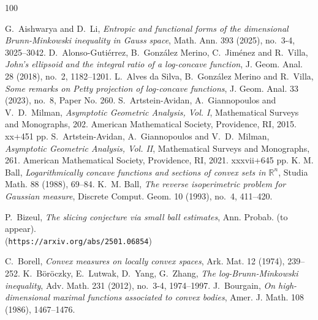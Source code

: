 \documentclass[11pt,leqno]{article}
\theoremstyle{definition}
\theoremstyle{remark}
\numberwithin{equation}{section}
\newcommand{\1}{\textbf{1}}
\begin{document}
\footnotesize

\begin{thebibliography}{100}
\footnotesize

 \textrm{G.\ Aishwarya and D.\ Li}, \textit{Entropic and functional forms of the dimensional Brunn-Minkowski inequality in Gauss space}, Math. Ann.  393 (2025), no.~3-4, 3025--3042.
 \textrm{D.\ Alonso-Guti\'{e}rrez, B.\ Gonz\'{a}lez Merino, C.\ Jim\'{e}nez and R.\ Villa}, 
\textit{John's ellipsoid and the integral ratio of a log-concave function}, J. Geom. Anal. 28 (2018), no.~2, 1182--1201.
 \textrm{L.\ Alves da Silva, B.\ Gonz\'{a}lez Merino and R.\ Villa}, \textit{Some remarks on Petty projection of log-concave functions}, 
J. Geom. Anal. 33 (2023), no.~8, Paper No. 260.
 \textrm{S.\ Artstein-Avidan, A.\ Giannopoulos and V.\ D.\ Milman},
\textit{Asymptotic Geometric Analysis, Vol. I}, Mathematical Surveys and Monographs, 202.
American Mathematical Society, Providence, RI, 2015. xx+451 pp.
 \textrm{S.\ Artstein-Avidan, A.\ Giannopoulos and V.\ D.\ Milman},
\textit{Asymptotic Geometric Analysis, Vol. II}, Mathematical Surveys and Monographs, 261.
American  Mathematical Society, Providence, RI, 2021. xxxvii+645 pp.
 \textrm{K. M. Ball}, \textit{Logarithmically concave functions and sections of convex sets in ${\mathbb R}^n$},
Studia Math. {88} (1988), 69--84.
 \textrm{K.~M. Ball}, \textit{The reverse isoperimetric problem for Gaussian measure}, Discrete Comput. Geom. 10 (1993), no.~4, 411--420.

 \textrm{P.\ Bizeul}, \textit{The slicing conjecture via small ball estimates}, Ann. Probab. (to appear).\\
({\tt https://arxiv.org/abs/2501.06854})

 \textrm{C.\ Borell}, \textit{Convex measures on locally convex spaces},
Ark. Mat. {12} (1974), 239--252.
 \textrm{K.\ B\"or\"oczky, E.\ Lutwak, D.\ Yang, G.\ Zhang}, \textit{The log-Brunn-Minkowski inequality}, Adv. Math. 231 (2012), no.~3-4, 1974--1997.
 \textrm{J.\ Bourgain}, \textit{On high-dimensional maximal functions associated to convex bodies},
Amer. J. Math. {108} (1986), 1467--1476.


\end{thebibliography}
\end{document}
